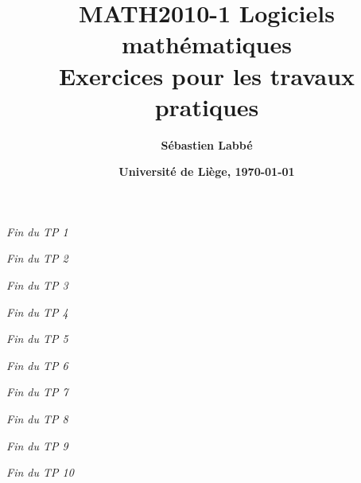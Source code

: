 

\thispagestyle{empty}
\title{\sffamily\bfseries
MATH2010-1 Logiciels mathématiques\\
    Exercices pour les travaux pratiques}
\author{\sffamily\bfseries Sébastien Labbé}
\date{\sffamily\bfseries Université de Liège, \today}



\maketitle




\hfill{\it Fin du TP 1}


\hfill{\it Fin du TP 2}



\hfill{\it Fin du TP 3}


\hfill{\it Fin du TP 4}

\hfill{\it Fin du TP 5}

\hfill{\it Fin du TP 6}



\hfill{\it Fin du TP 7}


\hfill{\it Fin du TP 8}


\hfill{\it Fin du TP 9}

\hfill{\it Fin du TP 10}

